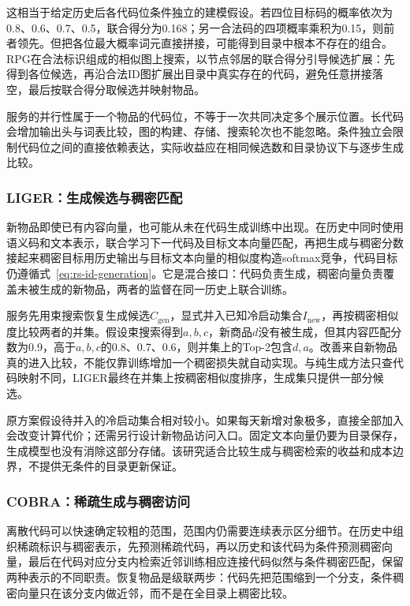 这相当于给定历史后各代码位条件独立的建模假设。若四位目标码的概率依次为0.8、0.6、0.7、0.5，联合得分为0.168；另一合法码的四项概率乘积为0.15，则前者领先。但把各位最大概率词元直接拼接，可能得到目录中根本不存在的组合。RPG在合法标识组成的相似图上搜索，以节点邻居的联合得分引导候选扩展：先得到各位候选，再沿合法ID图扩展出目录中真实存在的代码，避免任意拼接落空，最后按联合得分取候选并映射物品。

服务的并行性属于一个物品的代码位，不等于一次共同决定多个展示位置。长代码会增加输出头与词表比较，图的构建、存储、搜索轮次也不能忽略。条件独立会限制代码位之间的直接依赖表达，实际收益应在相同候选数和目录协议下与逐步生成比较。

\Needspace{100mm}
\subsubsection{LIGER：生成候选与稠密匹配}
\label{sec:rs-liger}

新物品即使已有内容向量，也可能从未在代码生成训练中出现。在历史中同时使用语义码和文本表示，联合学习下一代码及目标文本向量匹配，再把生成与稠密分数接起来稠密目标用历史输出与目标文本向量的相似度构造softmax竞争，代码目标仍遵循式~\eqref{eq:rs-id-generation}。它是混合接口：代码负责生成，稠密向量负责覆盖未被生成的新物品，两者的监督在同一历史上联合训练。

服务先用束搜索恢复生成候选$C_{\mathrm{gen}}$，显式并入已知冷启动集合$I_{\mathrm{new}}$，再按稠密相似度比较两者的并集。假设束搜索得到$a,b,c$，新商品$d$没有被生成，但其内容匹配分数为0.9，高于$a,b,c$的0.8、0.7、0.6，则并集上的Top-2包含$d,a$。改善来自新物品真的进入比较，不能仅靠训练增加一个稠密损失就自动实现。与纯生成方法只查代码映射不同，LIGER最终在并集上按稠密相似度排序，生成集只提供一部分候选。

原方案假设待并入的冷启动集合相对较小。如果每天新增对象极多，直接全部加入会改变计算代价；还需另行设计新物品访问入口。固定文本向量仍要为目录保存，生成模型也没有消除这部分存储。该研究适合比较生成与稠密检索的收益和成本边界，不提供无条件的目录更新保证。

\subsubsection{COBRA：稀疏生成与稠密访问}
\label{sec:rs-cobra}

离散代码可以快速确定较粗的范围，范围内仍需要连续表示区分细节。在历史中组织稀疏标识与稠密表示，先预测稀疏代码，再以历史和该代码为条件预测稠密向量，最后在代码对应分支内检索近邻训练相应连接代码似然与条件稠密匹配，保留两种表示的不同职责。恢复物品是级联两步：代码先把范围缩到一个分支，条件稠密向量只在该分支内做近邻，而不是在全目录上稠密比较。

